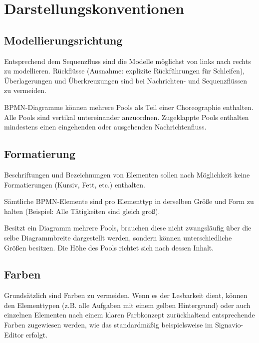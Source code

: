 \documentclass[12pt,report]{snetTeaching}
\begin{document}
\section{Darstellungskonventionen}

\subsection{Modellierungsrichtung}

Entsprechend dem Sequenzfluss sind die Modelle möglichst von links nach rechts zu modellieren. Rückflüsse (Ausnahme: explizite Rückführungen für Schleifen), Überlagerungen und Überkreuzungen sind bei Nachrichten- und Sequenzflüssen zu vermeiden.

BPMN-Diagramme können mehrere Pools als Teil einer Choreographie enthalten. Alle Pools sind vertikal untereinander anzuordnen. Zugeklappte Pools enthalten mindestens einen eingehenden oder ausgehenden Nachrichtenfluss.

\subsection{Formatierung}

Beschriftungen und Bezeichnungen von Elementen sollen nach Möglichkeit keine Formatierungen (Kursiv, Fett, etc.) enthalten.

Sämtliche BPMN-Elemente sind pro Elementtyp in derselben Größe und Form zu halten (Beispiel: Alle Tätigkeiten sind gleich groß).

Besitzt ein Diagramm mehrere Pools, brauchen diese nicht zwangsläufig über die selbe Diagrammbreite dargestellt werden, sondern können unterschiedliche Größen besitzen. Die Höhe des Pools richtet sich nach dessen Inhalt.

\subsection{Farben}
Grundsätzlich sind Farben zu vermeiden. Wenn es der Lesbarkeit dient, können den Elementtypen (z.B. alle Aufgaben mit einem gelben Hintergrund) oder auch einzelnen Elementen nach einem klaren Farbkonzept zurückhaltend entsprechende Farben zugewiesen werden, wie das standardmäßig beispielsweise im Signavio-Editor erfolgt.


\begin{Rahmen}
	\\
\end{Rahmen}
\end{document}
